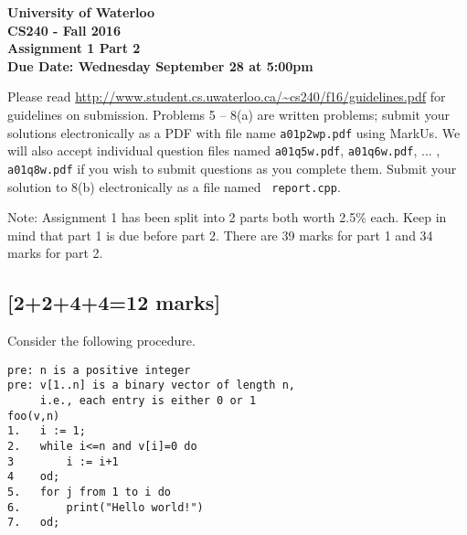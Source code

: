 \documentclass[12pt]{article}
\begin{document}
\begin{center}
{\Large\bf University of Waterloo}\\
\vspace{3mm}
{\Large\bf CS240 - Fall 2016}\\
\vspace{2mm}
{\Large\bf Assignment 1 Part 2}\\
\vspace{3mm}
\textbf{Due Date: Wednesday September 28 at 5:00pm}
\end{center}

\def\question#1{\item[\bf #1.]}
\def\part#1{\item[\bf #1)]}
\newcommand{\pc}[1]{\mbox{\textbf{#1}}} %

Please read
\url{http://www.student.cs.uwaterloo.ca/~cs240/f16/guidelines.pdf}
for guidelines on submission.  Problems 5 -- 8(a) are written
problems; submit your solutions electronically as a PDF with file
name {\tt a01p2wp.pdf} using MarkUs. We will also accept individual
question files named {\tt a01q5w.pdf}, {\tt a01q6w.pdf}, ... , {\tt
a01q8w.pdf} if you wish to submit questions as you complete them.
Submit your solution to 8(b) electronically as a file named {\tt
report.cpp}.

Note: Assignment 1 has been split into 2 parts both worth 2.5\% each. 
Keep in mind that part 1 is due before part 2. 
There are 39 marks for part 1 and 34 marks for part 2.
\setcounter{subsection}{4}
\subsection{[2+2+4+4=12 marks]}

Consider the following procedure.

\begin{verbatim}
pre: n is a positive integer
pre: v[1..n] is a binary vector of length n, 
     i.e., each entry is either 0 or 1
foo(v,n)
1.   i := 1;
2.   while i<=n and v[i]=0 do 
3        i := i+1
4    od;
5.   for j from 1 to i do
6.       print("Hello world!")
7.   od;
\end{verbatim}
\end{document}
